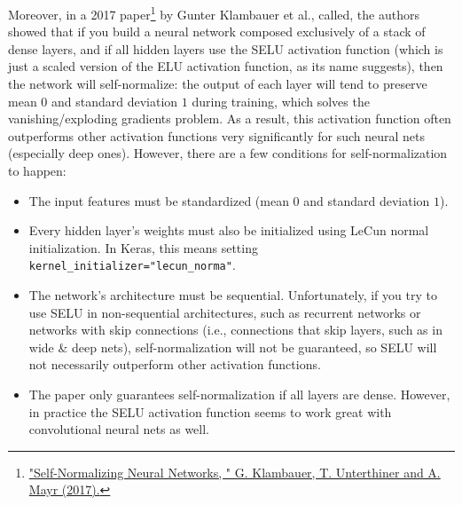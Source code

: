 \documentclass[12pt, letterpaper]{article}
\theoremstyle{definition}
\begin{document}
Moreover, in a 2017 paper\footnote{\href{https://homl.info/selu}{"Self-Normalizing Neural Networks, " G. Klambauer, T. Unterthiner and A. Mayr (2017).}} by Gunter Klambauer et al., called, the authors showed that if you build a neural network composed exclusively of a stack of dense layers, and if all hidden layers use the SELU activation function (which is just a scaled version of the ELU activation function, as its name suggests), then the network will self-normalize: the output of each layer will tend to preserve mean $0$ and standard deviation $1$ during training, which solves the vanishing/exploding gradients problem. As a result, this activation function often outperforms other activation functions very significantly for such neural nets (especially deep ones). However, there are a few conditions for self-normalization to happen:
\begin{itemize}
\item The input features must be standardized (mean $0$ and standard deviation $1$).
\item Every hidden layer's weights must also be initialized using LeCun normal initialization. In Keras, this means setting \lstinline+kernel_initializer="lecun_norma"+.
\item The network's architecture must be sequential. Unfortunately, if you try to use SELU in non-sequential architectures, such as recurrent networks or networks with skip connections (i.e., connections that skip layers, such as in wide \& deep nets), self-normalization will not be guaranteed, so SELU will not necessarily outperform other activation functions.
\item The paper only guarantees self-normalization if all layers are dense. However, in practice the SELU activation function seems to work great with convolutional neural nets as well.
\end{itemize}
\end{document}
